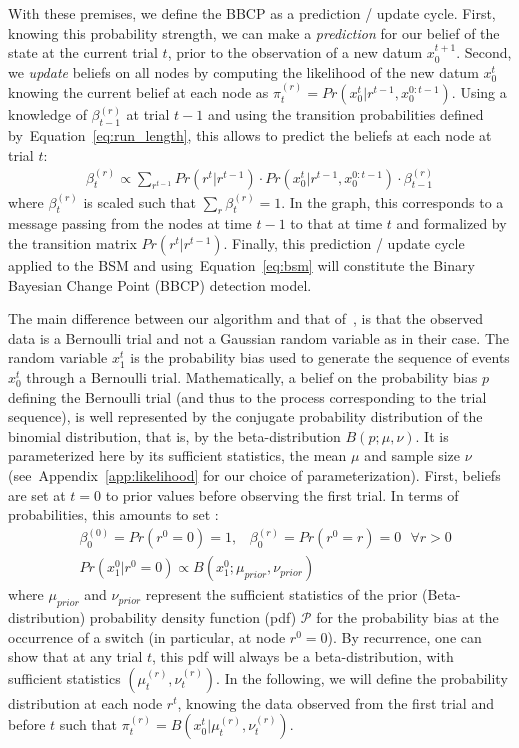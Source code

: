 \documentclass[12pt,english]{article}%
\newcommand{\eqa}[1]{\begin{align}#1\end{align}}
\newcommand{\Pp}{\mathcal{P}}
\newcommand{\citep}[1]{\parencite{#1}}
\newcommand{\seeEq}[1]{Equation~\ref{eq:#1}}
\newcommand{\seeApp}[1]{Appendix~\ref{app:#1}}
\begin{document}
With these premises, we define the BBCP
as a prediction / update cycle.
First, knowing this probability strength, %
we can make a \emph{prediction} for our belief of the state at the current trial $t$,
prior to the observation of a new datum $x_0^{t+1}$.
Second, we \emph{update} beliefs on all nodes
by computing the likelihood of the new datum $x_0^t$ 
knowing the current belief at each node
as $\pi^{(r)}_t=Pr(x_0^t | r^{t-1}, x_0^{0:t-1})$.
Using a knowledge of $\beta^{(r)}_{t-1}$ at trial $t-1$ and
using the transition probabilities defined by~\seeEq{run_length},
this allows to predict the beliefs at each node at trial $t$:
\eqa{
\beta^{(r)}_t \propto \sum_{r^{t-1}}  Pr(r^t | r^{t-1}) \cdot  Pr(x_0^t | r^{t-1}, x_0^{0:t-1}) \cdot  \beta^{(r)}_{t-1}
\label{eq:pred_node}
}
where $\beta^{(r)}_t$ is scaled such that $\sum_r \beta^{(r)}_t = 1$.
In the graph, this corresponds to a message passing from the nodes at time $t-1$
to that at time $t$ and formalized by the transition matrix $Pr(r^t | r^{t-1})$.
Finally, this prediction / update cycle applied to the BSM and using~\seeEq{bsm}
will constitute the Binary Bayesian Change Point (BBCP) detection model.

The main difference between our algorithm and that of~\citep{AdamsMackay2007},
is that the observed data is a Bernoulli trial and not a Gaussian random variable as in their case.
The random variable $x_1^t$ is the probability bias used
to generate the sequence of events $x_0^t$ through a Bernoulli trial.
Mathematically, a belief on the probability bias $p$ defining the Bernoulli trial (and thus to the process corresponding to the trial sequence),
is well represented by the conjugate probability distribution of the binomial distribution,
that is, by the beta-distribution $B(p; \mu, \nu)$.
It is parameterized here by its sufficient statistics,
the mean $\mu$ and sample size $\nu$
(see~\seeApp{likelihood} for our choice of parameterization).
First, beliefs are set at $t=0$ to prior values before observing the first trial.
In terms of probabilities, this amounts to set :
\eqa{
& \beta^{(0)}_0=Pr(r^0=0)=1 \text{,}\quad \beta^{(r)}_0=Pr(r^0=r)=0 \text{ } \forall r>0 \\
& Pr(x_1^0 | r^0=0) \propto B(x_1^0; \mu_{prior}, \nu_{prior})
}
where $\mu_{prior}$ and $\nu_{prior}$ represent the sufficient statistics
of the prior (Beta-distribution) probability density function (pdf) $\Pp$
for the probability bias
at the occurrence of a switch (in particular, at node $r^0=0$).
By recurrence, one can show that at any trial $t$,
this pdf will always be a beta-distribution,
 with sufficient statistics $(\mu^{(r)}_{t}, \nu^{(r)}_{t})$.
In the following, we will define the probability distribution at each node $r^t$,
knowing the data observed from the first trial and before $t$ such that
$
\pi^{(r)}_t = B( x_0^t |  \mu^{(r)}_{t}, \nu^{(r)}_{t})
$. %
\end{document}
